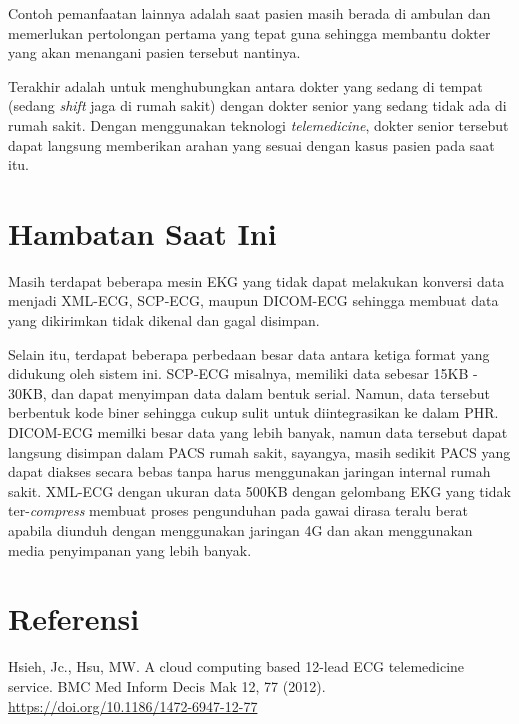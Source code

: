 \documentclass[12pt, a4paper]{article}
\begin{document}
Contoh pemanfaatan lainnya adalah saat pasien masih berada di ambulan dan memerlukan pertolongan pertama yang tepat guna sehingga membantu dokter yang akan menangani pasien tersebut nantinya.

Terakhir adalah untuk menghubungkan antara dokter yang sedang di tempat (sedang \textit{shift} jaga di rumah sakit) dengan dokter senior yang sedang tidak ada di rumah sakit. Dengan menggunakan teknologi \textit{telemedicine}, dokter senior tersebut dapat langsung memberikan arahan yang sesuai dengan kasus pasien pada saat itu.

\section*{Hambatan Saat Ini}
Masih terdapat beberapa mesin EKG yang tidak dapat melakukan konversi data menjadi XML-ECG, SCP-ECG, maupun DICOM-ECG sehingga membuat data yang dikirimkan tidak dikenal dan gagal disimpan.

Selain itu, terdapat beberapa perbedaan besar data antara ketiga format yang didukung oleh sistem ini. SCP-ECG misalnya, memiliki data sebesar 15KB - 30KB, dan dapat menyimpan data dalam bentuk serial. Namun, data tersebut berbentuk kode biner sehingga cukup sulit untuk diintegrasikan ke dalam PHR. DICOM-ECG memilki besar data yang lebih banyak, namun data tersebut dapat langsung disimpan dalam PACS rumah sakit, sayangya, masih sedikit PACS yang dapat diakses secara bebas tanpa harus menggunakan jaringan internal rumah sakit. XML-ECG dengan ukuran data 500KB dengan gelombang EKG yang tidak ter-\textit{compress} membuat proses pengunduhan pada gawai dirasa teralu berat apabila diunduh dengan menggunakan jaringan 4G dan akan menggunakan media penyimpanan yang lebih banyak.

\section*{Referensi}

\noindent Hsieh, Jc., Hsu, MW. A cloud computing based 12-lead ECG telemedicine service. BMC Med Inform Decis Mak 12, 77 (2012). \url{https://doi.org/10.1186/1472-6947-12-77}
\end{document}

